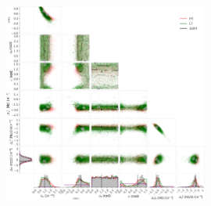 \begin{figure}[!phtb]
\begin{center}
\includegraphics[width=0.6\textwidth]{./figures/codeeval/simulations/signal_freq/two/ffdot_inj2}
\caption{ \protect}
\end{center}
\end{figure}
